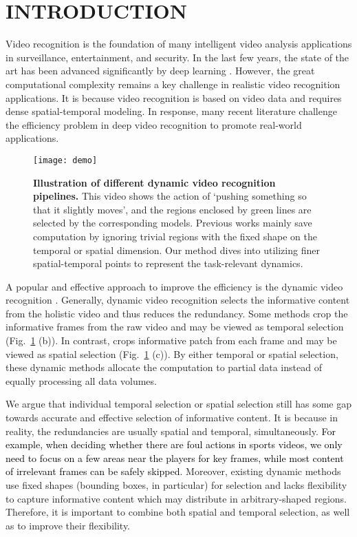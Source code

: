 \documentclass[journal]{IEEEtran}
\begin{document}
\IEEEpeerreviewmaketitle

\section{INTRODUCTION} \label{sec:intro}
Video recognition is the foundation of many intelligent video analysis applications in surveillance, entertainment, and security.
In the last few years, the state of the art has been advanced significantly by deep learning \cite{carreira2017quo, feichtenhofer2019slowfast}.
However, the great computational complexity remains a key challenge in realistic video recognition applications. It is because video recognition is based on video data and requires dense spatial-temporal modeling. In response, many recent literature \cite{lin2019tsm, zhu2020faster, wu2019multi, zheng2020dynamic, fan2018watching} challenge the efficiency problem in deep video recognition to promote real-world applications. 

\begin{figure}
	\centering
	\texttt{[image: demo]}
	\caption{
		\textbf{Illustration of different dynamic video recognition pipelines.}
		This video shows the action of `pushing something so that it slightly moves', and the regions enclosed by green lines are selected by the corresponding models.
		Previous works mainly save computation by ignoring trivial regions with the fixed shape on the temporal or spatial dimension. 
		Our method dives into utilizing finer spatial-temporal points to represent the task-relevant dynamics.
	}
	\label{fig:motivation}
\end{figure}

A popular and effective approach to improve the efficiency is the dynamic video recognition \cite{korbar2019scsampler, wu2019multi, zheng2020dynamic}. Generally, dynamic video recognition selects the informative content from the holistic video and thus reduces the redundancy. Some methods \cite{korbar2019scsampler, wu2019multi} crop the informative frames from the raw video and may be viewed as temporal selection (Fig.~\ref{fig:motivation} (b)). In contrast, \cite{Wang_2021_AdaFocus} crops informative patch from each frame and may be viewed as spatial selection (Fig.~\ref{fig:motivation} (c)). By either temporal or spatial selection, these dynamic methods allocate the computation to partial data instead of equally processing all data volumes. 

We argue that individual temporal selection or spatial selection still has some gap towards accurate and effective selection of informative content. It is because in reality, the redundancies are usually spatial and temporal, simultaneously. \textcolor{black}{For example, when deciding whether there are foul actions in sports videos, we only need to focus on a few areas near the players for key frames, while most content of irrelevant frames can be safely skipped}. Moreover, existing dynamic methods use fixed shapes (bounding boxes, in particular) for selection and lacks flexibility to capture informative content which may distribute in arbitrary-shaped regions. Therefore, it is important to combine both spatial and temporal selection, as well as to improve their flexibility.
\end{document}

